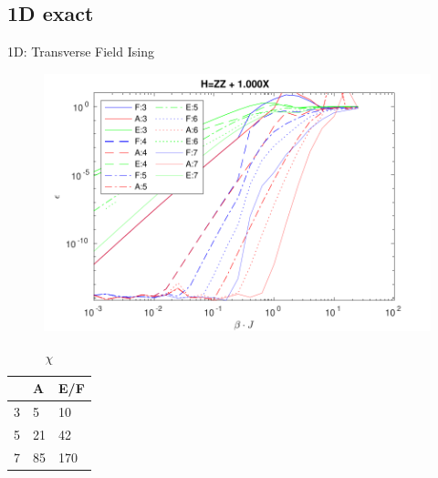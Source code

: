 \subsection{1D exact}

\begin{frame}{1D: Transverse Field Ising}

    \begin{minipage}{.75\textwidth}

        \begin{figure}
            \center
            \includegraphics[width=\textwidth]{../Figuren/benchmarking/t_ising.pdf}
        \end{figure}

    \end{minipage}
    \begin{minipage}{.14\textwidth}
        \begin{table}[]
            \caption{$\chi$}
            \begin{tabular}{l|l l }
                  & A  & E/F \\
                \hline
                3 & 5  & 10  \\
                5 & 21 & 42  \\
                7 & 85 & 170 \\
            \end{tabular}
        \end{table}
    \end{minipage}

\end{frame}

